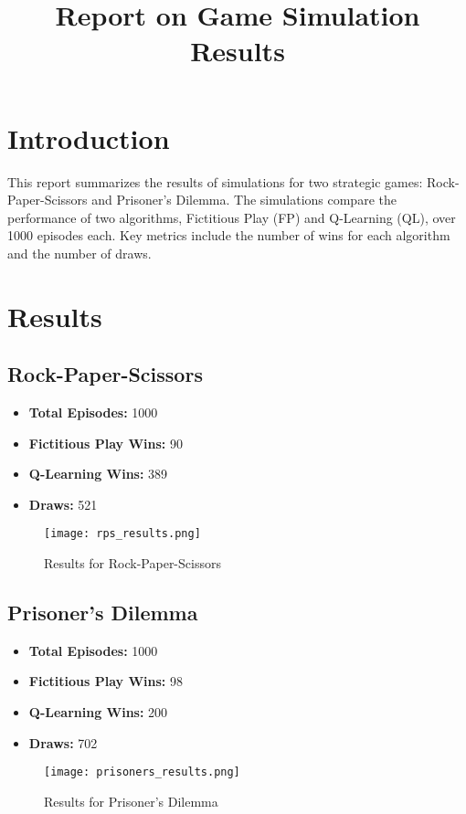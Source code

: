 \documentclass{article}
\title{Report on Game Simulation Results}
\author{}
\date{}
\begin{document}
\maketitle

\section*{Introduction}
This report summarizes the results of simulations for two strategic games: Rock-Paper-Scissors and Prisoner's Dilemma. The simulations compare the performance of two algorithms, Fictitious Play (FP) and Q-Learning (QL), over 1000 episodes each. Key metrics include the number of wins for each algorithm and the number of draws.

\section*{Results}

\subsection*{Rock-Paper-Scissors}
\begin{itemize}
    \item \textbf{Total Episodes:} 1000
    \item \textbf{Fictitious Play Wins:} 90
    \item \textbf{Q-Learning Wins:} 389
    \item \textbf{Draws:} 521
\end{itemize}

\begin{figure}[h!]
\centering
\texttt{[image: rps\_results.png]}
\caption{Results for Rock-Paper-Scissors}
\end{figure}

\subsection*{Prisoner's Dilemma}
\begin{itemize}
    \item \textbf{Total Episodes:} 1000
    \item \textbf{Fictitious Play Wins:} 98
    \item \textbf{Q-Learning Wins:} 200
    \item \textbf{Draws:} 702
\end{itemize}

\begin{figure}[h!]
\centering
\texttt{[image: prisoners\_results.png]}
\caption{Results for Prisoner's Dilemma}
\end{figure}
\end{document}
